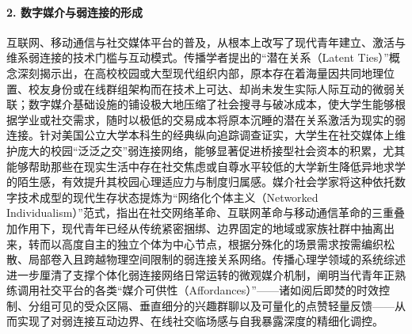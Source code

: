 \paragraph{2. 数字媒介与弱连接的形成}
互联网、移动通信与社交媒体平台的普及，从根本上改写了现代青年建立、激活与维系弱连接的技术门槛与互动模式。传播学者提出的“潜在关系（Latent Ties）”概念深刻揭示出，在高校校园或大型现代组织内部，原本存在着海量因共同地理位置、校友身份或在线群组架构而在技术上可达、却尚未发生实际人际互动的微弱关联；数字媒介基础设施的铺设极大地压缩了社会搜寻与破冰成本，使大学生能够根据学业或社交需求，随时以极低的交易成本将原本沉睡的潜在关系激活为现实的弱连接\cite{Haythornthwaite2005}。针对美国公立大学本科生的经典纵向追踪调查证实，大学生在社交媒体上维护庞大的校园“泛泛之交”弱连接网络，能够显著促进桥接型社会资本的积累，尤其能够帮助那些在现实生活中存在社交焦虑或自尊水平较低的大学新生降低异地求学的陌生感，有效提升其校园心理适应力与制度归属感\cite{Ellison2007}。媒介社会学家将这种依托数字技术成型的现代生存状态提炼为“网络化个体主义（Networked Individualism）”范式，指出在社交网络革命、互联网革命与移动通信革命的三重叠加作用下，现代青年已经从传统紧密捆绑、边界固定的地域或家族社群中抽离出来，转而以高度自主的独立个体为中心节点，根据分殊化的场景需求按需编织松散、局部卷入且跨越物理空间限制的弱连接关系网络\cite{Rainie2012}。传播心理学领域的系统综述进一步厘清了支撑个体化弱连接网络日常运转的微观媒介机制，阐明当代青年正熟练调用社交平台的各类“媒介可供性（Affordances）”——诸如阅后即焚的时效控制、分组可见的受众区隔、垂直细分的兴趣群聊以及可量化的点赞轻量反馈——从而实现了对弱连接互动边界、在线社交临场感与自我暴露深度的精细化调控\cite{Bayer2020}。

